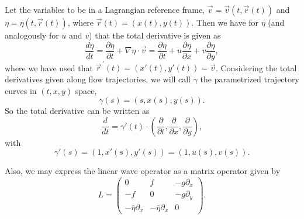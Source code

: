 \documentclass[10pt,a4paper]{article}
\begin{document}
Let the variables to be in a Lagrangian reference frame, $\vec{v}=\vec{v}(t,\vec{r}(t))$ and $\eta=\eta(t,\vec{r}(t))$, where $\vec{r}(t)=(x(t), y(t))$. Then we have for $\eta$ (and analogously for $u$ and $v$) that the total derivative is given as
\begin{equation}
\frac{d\eta}{dt}=\frac{\partial \eta}{\partial t}+\nabla \eta \cdot \vec{v} =  
\frac{\partial \eta}{\partial t} + u \frac{\partial \eta}{\partial x}+v\frac{\partial \eta}{\partial y},
\end{equation}
where we have used that $\vec{r}^{\,\prime}(t)=(x'(t), y'(t))=\vec{v}$. 
Considering the total derivatives given along flow trajectories, we will call $\gamma$ the parametrized trajectory curves in $(t, x, y)$ space, 
\begin{equation}
\gamma(s)=(s, x(s), y(s)).
\end{equation}
So the total derivative can be written as
\begin{equation}
\frac{d}{dt}= \gamma'(t) \cdot \left(\frac{\partial }{\partial t}, \frac{\partial }{\partial x},\frac{\partial }{\partial y} \right),
\end{equation}
with
\begin{equation}
\gamma'(s)=(1, x'(s), y'(s))=(1, u(s), v(s)).
\end{equation}


Also, we may express the linear wave operator as a matrix operator given by
\begin{equation}
L=
\left(\begin{array}{ccc}
  0 & f & -g\partial_{x}\\
 -f & 0 & -g\partial_{y}\\
 -\bar{\eta} \partial_{x}& -\bar{\eta} \partial_{x} & 0  
\end{array}\right).
\end{equation}
\end{document}
